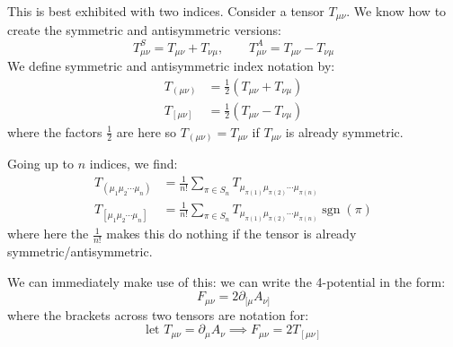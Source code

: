 \documentclass[../Main.tex]{subfiles}
\begin{document}
This is best exhibited with two indices. Consider a tensor $T_{\mu \nu}$. We know how to create the symmetric and antisymmetric versions:
\begin{equation*}
    T_{\mu \nu}^S = T_{\mu \nu} + T_{\nu\mu},\qquad T_{\mu\nu}^A = T_{\mu \nu} - T_{\nu \mu}
\end{equation*}
We define symmetric and antisymmetric index notation by:
\begin{align*}
    T_{(\mu \nu)} &= \frac12 (T_{\mu \nu} + T_{\nu \mu}) \\
    T_{[\mu \nu]} &= \frac12 (T_{\mu \nu} - T_{\nu \mu})
\end{align*}
where the factors $\frac12$ are here so $T_{(\mu \nu)} = T_{\mu\nu}$ if $T_{\mu\nu}$ is already symmetric.

Going up to $n$ indices, we find:
\begin{align*}
    T_{(\mu_1 \mu_2 \cdots \mu_n)} &= \frac{1}{n!} \sum_{\pi \in S_n} T_{\mu_{\pi(1)}\mu_{\pi(2)} \cdots \mu_{\pi(n)}} \\
    T_{[\mu_1 \mu_2 \cdots \mu_n]} &= \frac{1}{n!} \sum_{\pi \in S_n} T_{\mu_{\pi(1)}\mu_{\pi(2)} \cdots \mu_{\pi(n)}} \operatorname{sgn}(\pi)
\end{align*}
where here the $\frac{1}{n!}$ makes this do nothing if the tensor is already symmetric/antisymmetric.

We can immediately make use of this: we can write the 4-potential in the form:
\begin{equation*}
    F_{\mu \nu} = 2\partial_{[\mu} A_{\nu]}
\end{equation*}
where the brackets across two tensors are notation for:
\begin{equation*}
    \text{let } T_{\mu \nu} = \partial_\mu A_\nu \implies F_{\mu \nu} = 2T_{[\mu\nu]}
\end{equation*}
\end{document}
